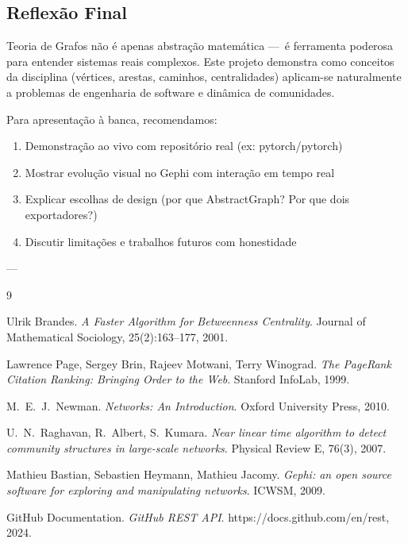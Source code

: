 \documentclass[12pt,a4paper]{article}
\begin{document}
\subsection{Reflexão Final}

Teoria de Grafos não é apenas abstração matemática —~é ferramenta poderosa para entender sistemas reais complexos. Este projeto demonstra como conceitos da disciplina (vértices, arestas, caminhos, centralidades) aplicam-se naturalmente a problemas de engenharia de software e dinâmica de comunidades.

Para apresentação à banca, recomendamos:
\begin{enumerate}
  \item Demonstração ao vivo com repositório real (ex: pytorch/pytorch)
  \item Mostrar evolução visual no Gephi com interação em tempo real
  \item Explicar escolhas de design (por que AbstractGraph? Por que dois exportadores?)
  \item Discutir limitações e trabalhos futuros com honestidade
\end{enumerate}

---

\begin{thebibliography}{9}

  Ulrik Brandes.
  \textit{A Faster Algorithm for Betweenness Centrality}.
  Journal of Mathematical Sociology, 25(2):163--177, 2001.

  Lawrence Page, Sergey Brin, Rajeev Motwani, Terry Winograd.
  \textit{The PageRank Citation Ranking: Bringing Order to the Web}.
  Stanford InfoLab, 1999.

  M.\ E.\ J.\ Newman.
  \textit{Networks: An Introduction}.
  Oxford University Press, 2010.

  U.\ N.\ Raghavan, R.\ Albert, S.\ Kumara.
  \textit{Near linear time algorithm to detect community structures in large-scale networks}.
  Physical Review E, 76(3), 2007.

  Mathieu Bastian, Sebastien Heymann, Mathieu Jacomy.
  \textit{Gephi: an open source software for exploring and manipulating networks}.
  ICWSM, 2009.

  GitHub Documentation.
  \textit{GitHub REST API}.
  https://docs.github.com/en/rest, 2024.

\end{thebibliography}
\end{document}
